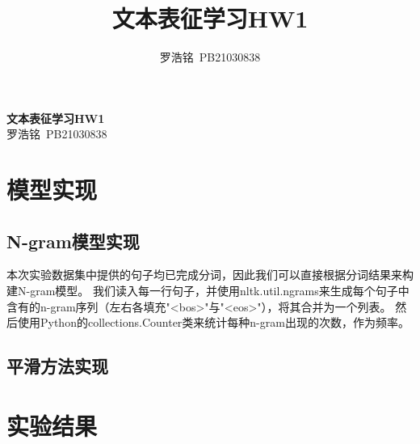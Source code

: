 \documentclass[twoside,11pt]{article}
\title{文本表征学习HW1}
\author{罗浩铭\ PB21030838}
\begin{document}
\fancyhf{} %
\fancyfoot[C]{\thepage} %

\renewcommand{\headrulewidth}{0pt} %

\begin{center}
  \textbf{\LARGE{文本表征学习HW1}}\\
  \vspace{0.1cm}
  \large{罗浩铭\ PB21030838}
\end{center}






\section{模型实现}
\subsection{N-gram模型实现}
本次实验数据集中提供的句子均已完成分词，因此我们可以直接根据分词结果来构建N-gram模型。
我们读入每一行句子，并使用nltk.util.ngrams来生成每个句子中含有的n-gram序列（左右各填充"<bos>"与"<eos>"），将其合并为一个列表。
然后使用Python的collections.Counter类来统计每种n-gram出现的次数，作为频率。


\subsection{平滑方法实现}

\section{实验结果}
\end{document}

